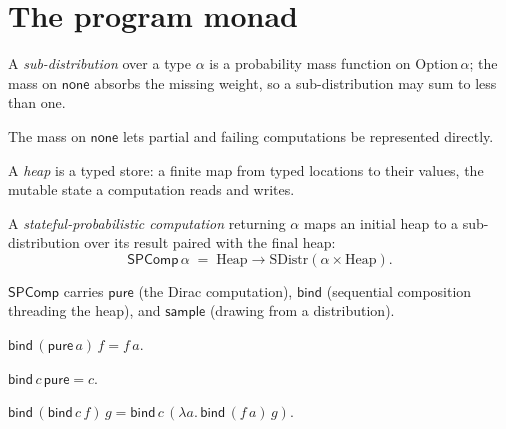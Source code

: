 \chapter{The program monad}

\begin{definition}
  \label{def:sdistr}
  \leanok
  A \emph{sub-distribution} over a type $\alpha$ is a probability mass function
  on $\mathrm{Option}\,\alpha$; the mass on $\mathsf{none}$ absorbs the missing
  weight, so a sub-distribution may sum to less than one.
\end{definition}

The mass on $\mathsf{none}$ lets partial and failing computations be represented
directly.

\begin{definition}
  \label{def:heap}
  \leanok
  A \emph{heap} is a typed store: a finite map from typed locations to their
  values, the mutable state a computation reads and writes.
\end{definition}

\begin{definition}
  \label{def:spcomp}
  \leanok
  A \emph{stateful-probabilistic computation} returning $\alpha$ maps an initial
  heap to a sub-distribution over its result paired with the final heap:
  \[
    \mathsf{SPComp}\,\alpha \;=\; \mathrm{Heap} \to \mathrm{SDistr}(\alpha \times \mathrm{Heap}).
  \]
\end{definition}

\begin{definition}
  \label{def:spcomp-ops}
  \leanok
  $\mathsf{SPComp}$ carries $\mathsf{pure}$ (the Dirac computation), $\mathsf{bind}$
  (sequential composition threading the heap), and $\mathsf{sample}$ (drawing from
  a distribution).
\end{definition}

\begin{lemma}
  \label{lem:pure-bind}
  \leanok
  $\mathsf{bind}\,(\mathsf{pure}\,a)\,f = f\,a$.
\end{lemma}

\begin{lemma}
  \label{lem:bind-pure}
  \leanok
  $\mathsf{bind}\,c\,\mathsf{pure} = c$.
\end{lemma}

\begin{lemma}[Associativity]
  \label{lem:bind-assoc}
  \leanok
  $\mathsf{bind}\,(\mathsf{bind}\,c\,f)\,g = \mathsf{bind}\,c\,(\lambda a.\,\mathsf{bind}\,(f\,a)\,g)$.
\end{lemma}
